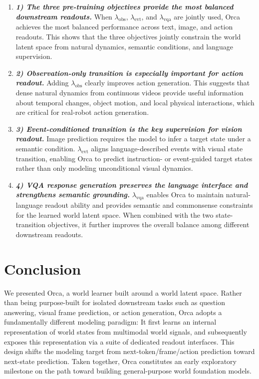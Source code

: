 \documentclass{llmxive}
\providecommand{\currentnavsection}{sec:intro}
\providecommand{\setnavsection}[1]{  \gdef\currentnavsection{#1}}
\begin{document}
\begin{enumerate}[
    leftmargin=1.35em,
    itemsep=0.35em,
    topsep=0.35em,
    parsep=0em
]
\item[] \textit{\textbf{1) The three pre-training objectives provide the most balanced downstream readouts.}}
When $\lambda_{\mathrm{obs}}$, $\lambda_{\mathrm{evt}}$, and $\lambda_{\mathrm{vqa}}$ are jointly used, Orca achieves the most balanced performance across text, image, and action readouts. This shows that the three objectives jointly constrain the world latent space from natural dynamics, semantic conditions, and language supervision.

\item[] \textit{\textbf{2) Observation-only transition is especially important for action readout.}} 
Adding $\lambda_{\mathrm{obs}}$ clearly improves action generation. This suggests that dense natural dynamics from continuous videos provide useful information about temporal changes, object motion, and local physical interactions, which are critical for real-robot action generation.

\item[] \textit{\textbf{3) Event-conditioned transition is the key supervision for vision readout.}} 
Image prediction requires the model to infer a target state under a semantic condition. $\lambda_{\mathrm{evt}}$ aligns language-described events with visual state transition, enabling Orca to predict instruction- or event-guided target states rather than only modeling unconditional visual dynamics.

\item[] \textit{\textbf{4) VQA response generation preserves the language interface and strengthens semantic grounding.}} 
$\lambda_{\mathrm{vqa}}$ enables Orca to maintain natural-language readout ability and provides semantic and commonsense constraints for the learned world latent space. When combined with the two state-transition objectives, it further improves the overall balance among different downstream readouts.
\end{enumerate}

\vspace{-1.5em}
\section{Conclusion}
\label{sec:conclusion}
\setnavsection{sec:conclusion}
We presented Orca, a world learner built around a world latent space. 
Rather than being purpose-built for isolated downstream tasks such as question answering, visual frame prediction, or action generation, Orca adopts a fundamentally different modeling paradigm:
It first learns an internal representation of world states from multimodal world signals, and subsequently exposes this representation via a suite of dedicated readout interfaces.
This design shifts the modeling target from next-token/frame/action prediction toward next-state prediction. 
Taken together, Orca constitutes an early exploratory milestone on the path toward building general-purpose world foundation models.
\end{document}
